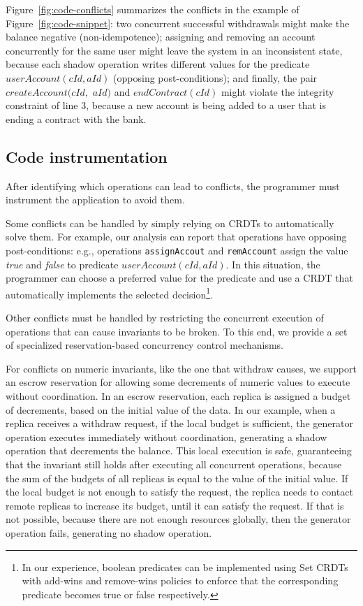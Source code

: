 \documentclass[11pt,dvipdfm]{article}
\begin{document}
Figure~\ref{fig:code-conflicts} summarizes the conflicts in the example
of Figure~\ref{fig:code-snippet}:
two concurrent successful withdrawals might make the balance negative
(non-idempotence);
assigning and removing an account concurrently for the same user might leave
the system in an inconsistent state, because each shadow operation writes different
values for the predicate $userAccount(cId, aId)$ (opposing post-conditions);
and finally, the pair $createAccount(cId,$ $ aId)$ and $endContract(cId)$ might
violate the integrity constraint of line 3, because a new account is being
added to a user that is ending a contract with the bank.


\subsection{Code instrumentation}
After identifying which operations can lead to conflicts, the programmer
must instrument the application to avoid them.

Some conflicts can be handled by simply relying on CRDTs to automatically solve
them.
For example, our analysis can report that operations have
opposing post-conditions: e.g., operations {\tt assignAccout} and {\tt remAccount}
assign the value \textit{true} and \textit{false} to predicate $userAccount(cId, aId)$.
In this situation, the programmer can choose a preferred value for the
predicate and use a CRDT that automatically implements the selected
decision\footnote{In our
experience, boolean predicates can be implemented using Set CRDTs with
add-wins and remove-wins policies to enforce that the corresponding
predicate becomes true or false
respectively.}.

Other conflicts must be handled by restricting the concurrent execution of
operations that can cause invariants to be broken. To this end, we provide a set
of specialized reservation-based concurrency control mechanisms.

For conflicts on numeric invariants, like the one that withdraw causes,
we support an escrow reservation for allowing some decrements of numeric
values to execute without coordination.
In an escrow reservation, each replica is assigned a budget of decrements,
based on the initial value of the data.
In our example, when a replica receives a withdraw request, if the local
budget is sufficient, the generator operation executes immediately
without coordination, generating a shadow operation that decrements
the balance.
This local execution is safe, guaranteeing that the invariant still holds
after executing all concurrent operations, because the sum
of the budgets of all replicas is equal to the value of the initial value.
If the local budget is not enough to satisfy the request, the replica needs to
contact remote replicas to increase its budget, until it can satisfy the request.
If that is not possible, because there are not enough resources globally,
then the generator operation fails, generating no shadow operation.
\end{document}
